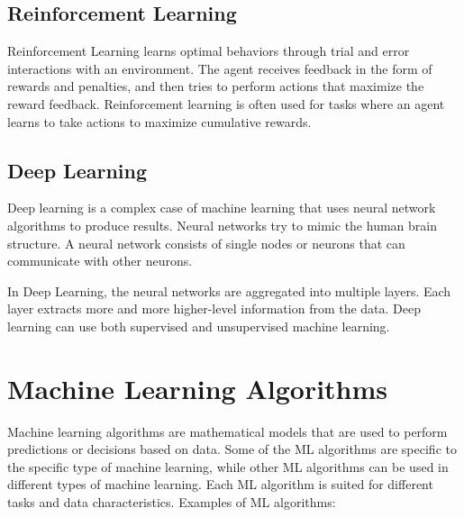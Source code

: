 \subsection{Reinforcement Learning} \label{rl}

Reinforcement Learning learns optimal behaviors through trial and error interactions with an environment. The agent receives feedback in the form of rewards and penalties, and then tries to perform actions that maximize the reward feedback. Reinforcement learning is often used for tasks where an agent learns to take actions to maximize cumulative rewards.

\subsection{Deep Learning} \label{dl}

Deep learning is a complex case of machine learning that uses neural network algorithms to produce results. Neural networks try to mimic the human brain structure. A neural network consists of single nodes or neurons that can communicate with other neurons.

In Deep Learning, the neural networks are aggregated into multiple layers. Each layer extracts more and more higher-level information from the data. Deep learning can use both supervised and unsupervised machine learning.

\section{Machine Learning Algorithms} \label{mlalg}

Machine learning algorithms are mathematical models that are used to perform predictions or decisions based on data. Some of the ML algorithms are specific to the specific type of machine learning, while other ML algorithms can be used in different types of machine learning. Each ML algorithm is suited for different tasks and data characteristics\cite{zhou2021machine}. Examples of ML algorithms:

